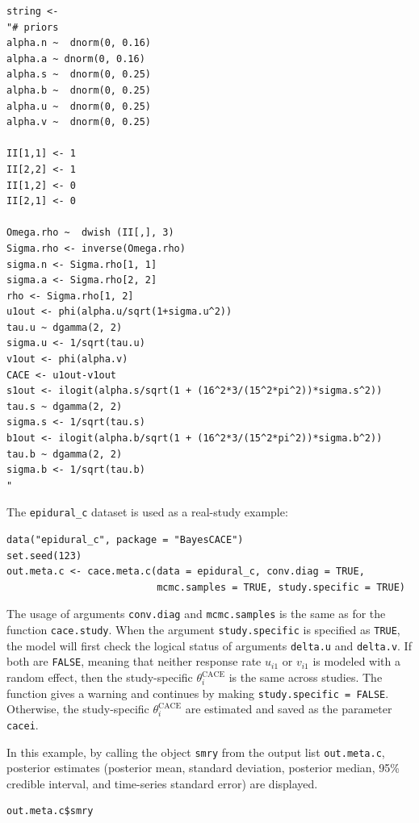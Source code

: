 \begin{verbatim}
string <-   
"# priors
alpha.n ~  dnorm(0, 0.16)
alpha.a ~ dnorm(0, 0.16)    
alpha.s ~  dnorm(0, 0.25)
alpha.b ~  dnorm(0, 0.25)
alpha.u ~  dnorm(0, 0.25)
alpha.v ~  dnorm(0, 0.25) 

II[1,1] <- 1
II[2,2] <- 1
II[1,2] <- 0
II[2,1] <- 0

Omega.rho ~  dwish (II[,], 3)
Sigma.rho <- inverse(Omega.rho)
sigma.n <- Sigma.rho[1, 1]
sigma.a <- Sigma.rho[2, 2]
rho <- Sigma.rho[1, 2]
u1out <- phi(alpha.u/sqrt(1+sigma.u^2))
tau.u ~ dgamma(2, 2)
sigma.u <- 1/sqrt(tau.u)
v1out <- phi(alpha.v)
CACE <- u1out-v1out
s1out <- ilogit(alpha.s/sqrt(1 + (16^2*3/(15^2*pi^2))*sigma.s^2))
tau.s ~ dgamma(2, 2)
sigma.s <- 1/sqrt(tau.s)
b1out <- ilogit(alpha.b/sqrt(1 + (16^2*3/(15^2*pi^2))*sigma.b^2))
tau.b ~ dgamma(2, 2)
sigma.b <- 1/sqrt(tau.b)
"
\end{verbatim}

\noindent The \texttt{epidural\_c} dataset is used as a real-study example:

\begin{verbatim}
data("epidural_c", package = "BayesCACE")
set.seed(123)
out.meta.c <- cace.meta.c(data = epidural_c, conv.diag = TRUE, 
                          mcmc.samples = TRUE, study.specific = TRUE)
\end{verbatim}

The usage of arguments \texttt{conv.diag} and \texttt{mcmc.samples} is the same as for the function \texttt{cace.study}.
When the argument \texttt{study.specific} is specified as \texttt{TRUE}, the model will first check the logical status of arguments \texttt{delta.u} and \texttt{delta.v}. If both are \texttt{FALSE}, meaning that neither response rate \(u_{i1}\) or \(v_{i1}\) is modeled with a random effect, then the study-specific \(\theta^\text{CACE}_i\) is the same across studies. The function gives a warning and continues by making \texttt{study.specific\ =\ FALSE}. Otherwise, the study-specific \(\theta^\text{CACE}_i\) are estimated and saved as the parameter \texttt{cacei}.

In this example, by calling the object \texttt{smry} from the output list \texttt{out.meta.c}, posterior estimates (posterior mean, standard deviation, posterior median, 95\% credible interval, and time-series standard error) are displayed.

\begin{verbatim}
out.meta.c$smry
\end{verbatim}

